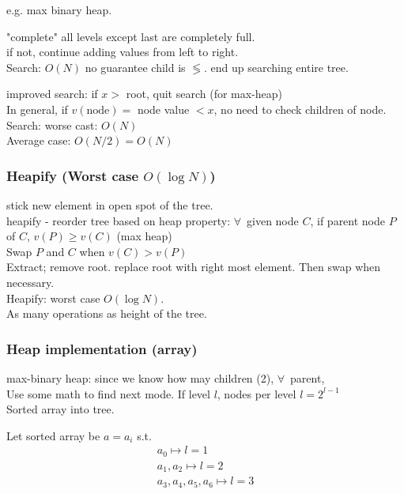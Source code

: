\documentclass[10pt]{amsart}
\begin{document}
e.g. max binary heap.

"complete" all levels except last are completely full. \\
if not, continue adding values from left to right. \\

Search: $O(N)$ no guarantee child is $\lessgtr$. end up searching entire tree.

improved search: if $x >$ root, quit search (for max-heap) \\
In general, if $v(\text{node}) =$ node value $< x$, no need to check children of node. \\

Search: worse cast: $O(N)$ \\
\phantom{Search} Average case: $O(N/2) = O(N)$ \\

\subsubsection{Heapify (Worst case $O(\log{N})$)} 

stick new element in open spot of the tree. \\
heapify - reorder tree based on heap property: $\forall \, $ given node $C$, if parent node $P$ of $C$, $v(P) \geq v(C)$ (max heap) \\

Swap $P$ and $C$ when $v(C) > v(P)$ \\
Extract; remove root. replace root with right most element. Then swap when necessary. \\

Heapify: worst case $O(\log{N})$. \\
As many operations as height of the tree.

\subsubsection{Heap implementation (array)}

max-binary heap: since we know how may children (2), $\forall \, $ parent, \\
Use some math to find next mode. If level $l$, nodes per level $l= 2^{l-1}$ \\
Sorted array into tree.

Let sorted array be $a=a_i$ s.t. 
\[
\begin{gathered} 
a_0 \mapsto l = 1\\ 
a_1, a_2 \mapsto l = 2 \\ 
a_3, a_4, a_5, a_6 \mapsto l = 3 
\end{gathered} 
\]
\end{document}
